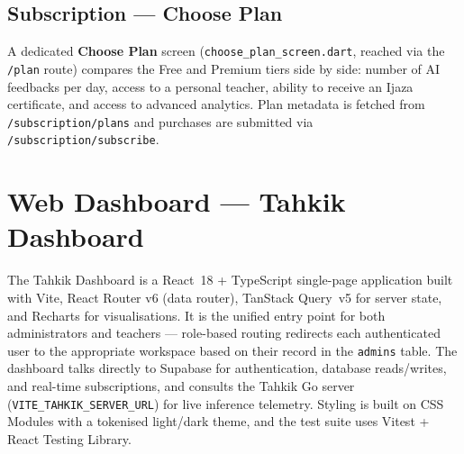 


\subsection{Subscription --- Choose Plan}

A dedicated \textbf{Choose Plan} screen (\texttt{choose\_plan\_screen.dart}, reached via the \texttt{/plan} route) compares the Free and Premium tiers side by side: number of AI feedbacks per day, access to a personal teacher, ability to receive an Ijaza certificate, and access to advanced analytics. Plan metadata is fetched from \texttt{/subscription/plans} and purchases are submitted via \texttt{/subscription/subscribe}.


\section{Web Dashboard — Tahkik Dashboard}
\label{sec:impl_dashboard}

\begin{emeraldbox}[title=Web Dashboard]
The Tahkik Dashboard is a React~18 + TypeScript single-page application built with Vite, React Router v6 (data router), TanStack Query~v5 for server state, and Recharts for visualisations. It is the unified entry point for both administrators and teachers --- role-based routing redirects each authenticated user to the appropriate workspace based on their record in the \texttt{admins} table. The dashboard talks directly to Supabase for authentication, database reads/writes, and real-time subscriptions, and consults the Tahkik Go server (\texttt{VITE\_TAHKIK\_SERVER\_URL}) for live inference telemetry. Styling is built on CSS Modules with a tokenised light/dark theme, and the test suite uses Vitest + React Testing Library.
\end{emeraldbox}

